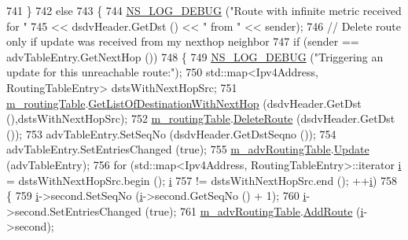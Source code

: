 \begin{DoxyCode}
741             \}
742           \textcolor{keywordflow}{else}
743             \{
744               \hyperlink{group__logging_ga413f1886406d49f59a6a0a89b77b4d0a}{NS\_LOG\_DEBUG} (\textcolor{stringliteral}{"Route with infinite metric received for "}
745                             << dsdvHeader.GetDst () << \textcolor{stringliteral}{" from "} << sender);
746               \textcolor{comment}{// Delete route only if update was received from my nexthop neighbor}
747               \textcolor{keywordflow}{if} (sender == advTableEntry.GetNextHop ())
748                 \{
749                   \hyperlink{group__logging_ga413f1886406d49f59a6a0a89b77b4d0a}{NS\_LOG\_DEBUG} (\textcolor{stringliteral}{"Triggering an update for this unreachable route:"});
750                   std::map<Ipv4Address, RoutingTableEntry> dstsWithNextHopSrc;
751                   \hyperlink{classns3_1_1dsdv_1_1RoutingProtocol_acc4cee466c2591e35f508ce58097a00e}{m\_routingTable}.\hyperlink{classns3_1_1dsdv_1_1RoutingTable_a7efb980be4e4f556b73905038483c154}{GetListOfDestinationWithNextHop}
       (dsdvHeader.GetDst (),dstsWithNextHopSrc);
752                   \hyperlink{classns3_1_1dsdv_1_1RoutingProtocol_acc4cee466c2591e35f508ce58097a00e}{m\_routingTable}.\hyperlink{classns3_1_1dsdv_1_1RoutingTable_a384f271a1393c513c4ae7ba4476c3e08}{DeleteRoute} (dsdvHeader.GetDst ());
753                   advTableEntry.SetSeqNo (dsdvHeader.GetDstSeqno ());
754                   advTableEntry.SetEntriesChanged (\textcolor{keyword}{true});
755                   \hyperlink{classns3_1_1dsdv_1_1RoutingProtocol_adce3cf63777d6099e58caa1cb198282c}{m\_advRoutingTable}.\hyperlink{classns3_1_1dsdv_1_1RoutingTable_a651762730975f809c720313b1332cb99}{Update} (advTableEntry);
756                   \textcolor{keywordflow}{for} (std::map<Ipv4Address, RoutingTableEntry>::iterator \hyperlink{bernuolliDistribution_8m_a6f6ccfcf58b31cb6412107d9d5281426}{i} = dstsWithNextHopSrc.begin ();
       \hyperlink{bernuolliDistribution_8m_a6f6ccfcf58b31cb6412107d9d5281426}{i}
757                        != dstsWithNextHopSrc.end (); ++\hyperlink{bernuolliDistribution_8m_a6f6ccfcf58b31cb6412107d9d5281426}{i})
758                     \{
759                       \hyperlink{bernuolliDistribution_8m_a6f6ccfcf58b31cb6412107d9d5281426}{i}->second.SetSeqNo (\hyperlink{bernuolliDistribution_8m_a6f6ccfcf58b31cb6412107d9d5281426}{i}->second.GetSeqNo () + 1);
760                       \hyperlink{bernuolliDistribution_8m_a6f6ccfcf58b31cb6412107d9d5281426}{i}->second.SetEntriesChanged (\textcolor{keyword}{true});
761                       \hyperlink{classns3_1_1dsdv_1_1RoutingProtocol_adce3cf63777d6099e58caa1cb198282c}{m\_advRoutingTable}.\hyperlink{classns3_1_1dsdv_1_1RoutingTable_a4eed9bac83e90f1db01e414892e10b9b}{AddRoute} (\hyperlink{bernuolliDistribution_8m_a6f6ccfcf58b31cb6412107d9d5281426}{i}->second);

\end{DoxyCode}
